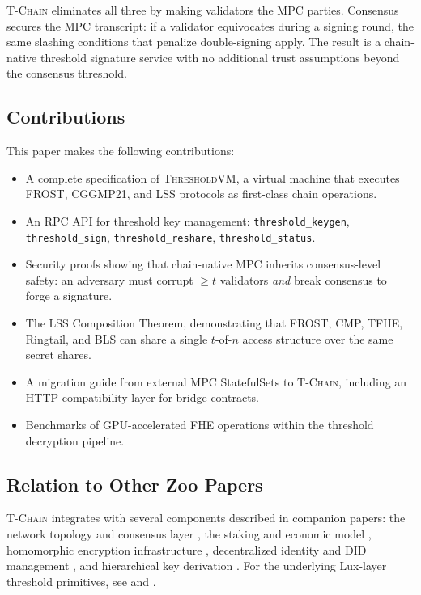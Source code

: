 \documentclass[11pt,letterpaper]{article}
\theoremstyle{definition}
\theoremstyle{remark}
\newcommand{\TChain}{\textsc{T-Chain}}
\newcommand{\ThresholdVM}{\textsc{ThresholdVM}}
\newcommand{\FROST}{\textsc{FROST}}
\newcommand{\CGGMP}{\textsc{CGGMP21}}
\newcommand{\LSS}{\textsc{LSS}}
\begin{document}
\TChain{} eliminates all three by making validators the MPC parties. Consensus secures the MPC transcript: if a validator equivocates during a signing round, the same slashing conditions that penalize double-signing apply. The result is a chain-native threshold signature service with no additional trust assumptions beyond the consensus threshold.

\subsection{Contributions}

This paper makes the following contributions:

\begin{itemize}
\item A complete specification of \ThresholdVM{}, a virtual machine that executes \FROST{}, \CGGMP{}, and \LSS{} protocols as first-class chain operations.
\item An RPC API for threshold key management: \texttt{threshold\_keygen}, \texttt{threshold\_sign}, \texttt{threshold\_reshare}, \texttt{threshold\_status}.
\item Security proofs showing that chain-native MPC inherits consensus-level safety: an adversary must corrupt $\geq t$ validators \emph{and} break consensus to forge a signature.
\item The \LSS{} Composition Theorem, demonstrating that FROST, CMP, TFHE, Ringtail, and BLS can share a single $t$-of-$n$ access structure over the same secret shares.
\item A migration guide from external MPC StatefulSets to \TChain{}, including an HTTP compatibility layer for bridge contracts.
\item Benchmarks of GPU-accelerated FHE operations within the threshold decryption pipeline.
\end{itemize}

\subsection{Relation to Other Zoo Papers}

\TChain{} integrates with several components described in companion papers: the network topology and consensus layer \cite{zoo-network-architecture}, the staking and economic model \cite{zoo-tokenomics}, homomorphic encryption infrastructure \cite{zoo-fhe}, decentralized identity and DID management \cite{zoo-identity-chain}, and hierarchical key derivation \cite{zoo-key-management}. For the underlying Lux-layer threshold primitives, see \cite{lux-threshold-sigs} and \cite{lux-mchain-mpc}.
\end{document}
